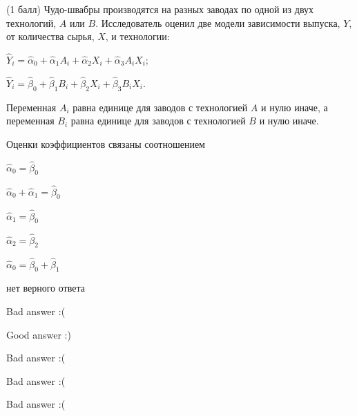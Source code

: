 
\begin{question}
(1 балл) Чудо-швабры производятся на разных заводах по одной из двух технологий,
\(A\) или \(B\). Исследователь оценил две модели зависимости выпуска,
\(Y\), от количества сырья, \(X\), и технологии:

\(\hat Y_i = \hat \alpha_0 + \hat\alpha_1 A_i + \hat\alpha_2 X_i + \hat\alpha_3 A_i X_i\);

\(\hat Y_i = \hat \beta_0 + \hat\beta_1 B_i + \hat\beta_2 X_i + \hat\beta_3 B_i X_i\).

Переменная \(A_i\) равна единице для заводов с технологией \(A\) и нулю
иначе, а переменная \(B_i\) равна единице для заводов с технологией
\(B\) и нулю иначе.

Оценки коэффициентов связаны соотношением
\begin{answerlist}
  \item \(\hat\alpha_0 = \hat\beta_0\)
  \item \(\hat\alpha_0 + \hat\alpha_1 = \hat\beta_0\)
  \item \(\hat\alpha_1 = \hat\beta_0\)
  \item \(\hat\alpha_2 = \hat\beta_2\)
  \item \(\hat\alpha_0 = \hat\beta_0 + \hat\beta_1\)
  \item нет верного ответа
\end{answerlist}
\end{question}

\begin{solution}
\begin{answerlist}
  \item Bad answer :(
  \item Good answer :)
  \item Bad answer :(
  \item Bad answer :(
  \item Bad answer :(
\end{answerlist}
\end{solution}
